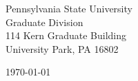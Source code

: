 \begin{minipage}{0.49\textwidth}
\begin{flushleft}
\noindent
Pennsylvania State University \\
Graduate Division\\
114 Kern Graduate Building\\
University Park, PA 16802\\
\end{flushleft}
\end{minipage}
\begin{minipage}{0.47\textwidth}
\begin{flushright}
\today
\end{flushright}
\end{minipage} \\

\newcommand{\univ}{Pennsylvania State University}
\newcommand{\univshort}{PSU}
\newcommand{\degree}{Ph.D.}
\newcommand{\dept}{Computer Science and Engineering}



